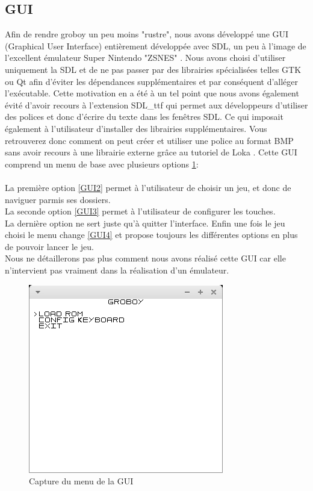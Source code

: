 \documentclass{report}
\begin{document}
\subsection{GUI}
Afin de rendre groboy un peu moins "rustre", nous avons développé une GUI (Graphical User Interface) entièrement développée avec SDL, un peu à l'image de l'excellent émulateur Super Nintendo "ZSNES" \cite{zsnes}. Nous avons choisi d'utiliser uniquement la SDL et de ne pas passer par des librairies spécialisées telles GTK ou Qt afin d'éviter les dépendances supplémentaires et par conséquent d'alléger l'exécutable. Cette motivation en a été à un tel point que nous avons également évité d'avoir recours à l'extension SDL\_ttf qui permet aux développeurs d'utiliser des polices et donc d'écrire du texte dans les fenêtres SDL. Ce qui imposait également à l'utilisateur d'installer des librairies supplémentaires. Vous retrouverez donc comment on peut créer et utiliser une police au format BMP sans avoir recours à une librairie externe grâce au tutoriel de Loka \cite{loka}. Cette GUI comprend un menu de base avec plusieurs options \ref{GUI1}: \\\\ 
La première option \ref{GUI2} permet à l'utilisateur de choisir un jeu, et donc de naviguer parmis ses dossiers.\\
La seconde option \ref{GUI3} permet à l'utilisateur de configurer les touches.\\
La dernière option ne sert juste qu'à quitter l'interface. Enfin une fois le jeu choisi le menu change \ref{GUI4} et propose toujours les différentes options en plus de pouvoir lancer le jeu.\\
Nous ne détaillerons pas plus comment nous avons réalisé cette GUI car elle n'intervient pas vraiment dans la réalisation d'un émulateur.

\begin{figure}[!h]
\centering
\includegraphics[scale=0.5]{images/screenshot_menu.png}
\caption{Capture du menu de la GUI}
\label{GUI1}
\end{figure}
\end{document}
